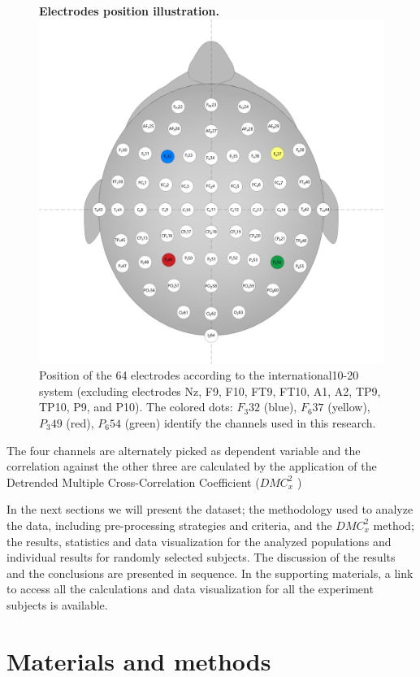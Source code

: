 \documentclass[10pt,letterpaper]{article}
\newcommand{\dmc}{\(DMC_x^2\) }
\begin{document}
\begin{figure}[!h]
  \caption{{\bf Electrodes position illustration.}
  \includegraphics[width=.9\textwidth]{../fig_cabeca/FIG_CABECA.png}
  \\ Position of the 64 electrodes according to the international10-20 system (excluding electrodes Nz, F9, F10, FT9, FT10, A1, A2, TP9, TP10, P9, and P10). The colored dots: \(F_{3}32\) (blue), \(F_{6}37\) (yellow), \(P_{3}49\) (red), \(P_{6}54\) (green) identify the channels used in this research.}
  \label{fig:cabeca}
  \end{figure}

The four channels are alternately picked as dependent variable and the correlation against the other three are calculated by the application of the Detrended Multiple Cross-Correlation Coefficient (\dmc) \cite{Zebende2018}

In the next sections we will present the dataset; the methodology used to analyze the data, including pre-processing strategies and criteria, and the \dmc method; the results, statistics and data visualization for the analyzed populations and individual results for randomly selected subjects. The discussion of the results and the conclusions are presented in sequence. In the supporting materials, a link to access all the calculations and data visualization for all the experiment subjects is available.

\section*{Materials and methods}
\end{document}
